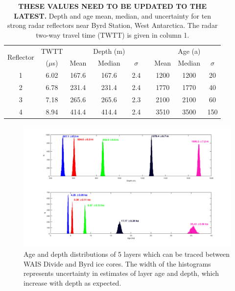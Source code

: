 \begin{table}[h]
\centering
\begin{tabular}{ c c c c c c c c c }
\cline{1-9}
\multirow{2}{*}{Reflector} & TWTT&  & Depth (m) & & & & Age (a)&\\   

& ($\mu$s)& Mean & Median & $\sigma$ & & Mean & Median & $\sigma$ \\
\cline{3-5} \cline{7-9}
 1 & 6.02   & 167.6  & 167.6  & 2.4 & &1200 & 1200 & 20   \\
 2 & 6.78   & 231.4  & 231.4  & 2.4 & &1770 & 1770 & 40   \\
 3 & 7.18   & 265.6  & 265.6  & 2.3 & &2100 & 2100 & 60  \\
 4 & 8.94   & 414.4  & 414.4  & 2.4 & &3510 & 3500 & 150   \\
\cline{1-9}
\end{tabular}
\captionsetup{width=.9\textwidth}
\caption{\textbf{THESE VALUES NEED TO BE UPDATED TO THE LATEST.} Depth and age mean, median, and uncertainty for ten strong radar reflectors near Byrd Station, West Antarctica. The radar two-way travel time (TWTT) is given in column 1. }
\label{tab:depthunc}
\end{table}




\begin{figure}[h]
\centering
\includegraphics[scale=0.5]{figures/agedepthhisto}
\caption[]{Age and depth distributions of 5 layers which can be traced between WAIS Divide and Byrd ice cores. The width of the histograms represents uncertainty in estimates of layer age and depth, which increase with depth as expected. }
\label{fig:layer_agedepth}
\end{figure}

